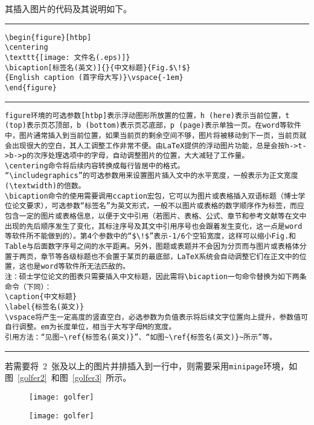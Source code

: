 其插入图片的代码及其说明如下。
\vspace{1em}\noindent\hrule
\begin{lstlisting}
\begin{figure}[htbp]
\centering
\texttt{[image: 文件名(.eps)]}
\bicaption[标签名(英文)]{}{中文标题}{Fig.$\!$}
{English caption (首字母大写)}\vspace{-1em}
\end{figure}
\end{lstlisting}
\noindent\hrule
\begin{lstlisting}
figure环境的可选参数[htbp]表示浮动图形所放置的位置，h (here)表示当前位置，t (top)表示页芯顶部，b (bottom)表示页芯底部，p (page)表示单独一页。在word等软件中，图片通常插入到当前位置，如果当前页的剩余空间不够，图片将被移动到下一页，当前页就会出现很大的空白，其人工调整工作非常不便。由LaTeX提供的浮动图片功能，总是会按h->t->b->p的次序处理选项中的字母，自动调整图片的位置，大大减轻了工作量。
\centering命令将后续内容转换成每行皆居中的格式。
“\includegraphics”的可选参数用来设置图片插入文中的水平宽度，一般表示为正文宽度(\textwidth)的倍数。
\bicaption命令的使用需要调用ccaption宏包，它可以为图片或表格插入双语标题（博士学位论文要求），可选参数“标签名”为英文形式，一般不以图片或表格的数字顺序作为标签，而应包含一定的图片或表格信息，以便于文中引用（若图片、表格、公式、章节和参考文献等在文中出现的先后顺序发生了变化，其标注序号及其文中引用序号也会跟着发生变化，这一点是word等软件所不能做到的）。第4个参数中的“$\!$”表示-1/6个空铅宽度，这样可以缩小Fig.和Table与后面数字序号之间的水平距离。另外，图题或表题并不会因为分页而与图片或表格体分置于两页，章节等各级标题也不会置于某页的最底部，LaTeX系统会自动调整它们在正文中的位置，这也是word等软件所无法匹敌的。
注：硕士学位论文的图表只需要插入中文标题，因此需将\bicaption一句命令替换为如下两条命令（下同）：
\caption{中文标题}
\label{标签名(英文)}
\vspace将产生一定高度的竖直空白，必选参数为负值表示将后续文字位置向上提升，参数值可自行调整。em为长度单位，相当于大写字母M的宽度。
引用方法：“见图~\ref{标签名(英文)}”、“如图~\ref{标签名(英文)}~所示”等。
\end{lstlisting}
\noindent\hrule\vspace{1em}
若需要将~2~张及以上的图片并排插入到一行中，则需要采用\verb|minipage|环境，如图~\ref{golfer2}~和图~\ref{golfer3}~所示。
\begin{figure}[htbp]
	\centering
	\begin{minipage}{0.4\textwidth}
		\centering
		\texttt{[image: golfer]}
	\end{minipage}
	\begin{minipage}{0.4\textwidth}
		\centering
		\texttt{[image: golfer]}
	\end{minipage}\vspace{-1em}
\end{figure}


